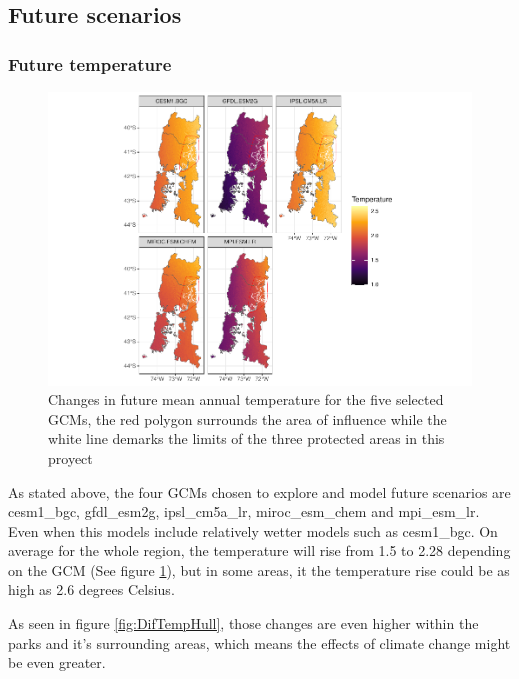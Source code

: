 \documentclass[]{article}
\begin{document}
\hypertarget{future-scenarios}{%
\subsection{Future scenarios}\label{future-scenarios}}

\hypertarget{future-temperature}{%
\subsubsection{Future temperature}\label{future-temperature}}

\begin{figure}
\centering
\includegraphics{Review_and_climate_files/figure-latex/DifTemp-1.pdf}
\caption{\label{fig:DifTemp}Changes in future mean annual temperature for the five selected GCMs, the red polygon surrounds the area of influence while the white line demarks the limits of the three protected areas in this proyect}
\end{figure}

As stated above, the four GCMs chosen to explore and model future scenarios are cesm1\_bgc, gfdl\_esm2g, ipsl\_cm5a\_lr, miroc\_esm\_chem and mpi\_esm\_lr. Even when this models include relatively wetter models such as cesm1\_bgc. On average for the whole region, the temperature will rise from 1.5 to 2.28 depending on the GCM (See figure \ref{fig:DifTemp}), but in some areas, it the temperature rise could be as high as 2.6 degrees Celsius.

As seen in figure \ref{fig:DifTempHull}, those changes are even higher within the parks and it's surrounding areas, which means the effects of climate change might be even greater.
\end{document}

